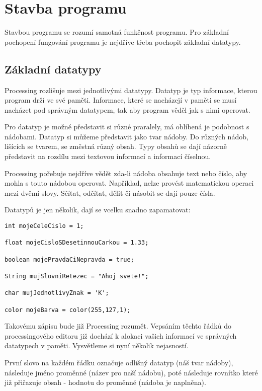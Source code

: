 \documentclass[11pt]{article}
\begin{document}
\newpage
\section{Stavba programu}


Stavbou programu se rozumí samotná funkčnost programu. Pro základní pochopení fungování programu je nejdříve třeba pochopit základní datatypy.

\subsection{Základní datatypy}

Processing rozlišuje mezi jednotlivými datatypy. Datatyp je typ informace, kterou program drží ve své paměti. Informace, které se nacházejí v paměti se musí nacházet pod správným datatypem, tak aby program věděl jak s nimi operovat.

Pro datatyp je možné představit si různé praralely, má oblíbená je podobnost s nádobami. Datatyp si můžeme představit jako tvar nádoby. Do různých nádob, lišících se tvarem, se změstná různý obsah. Typy obsahů se dají názorně představit na rozdílu mezi textovou informací a informací číselnou.

Processing pořebuje nejdříve vědět zda-li nádoba obsahuje text nebo číslo, aby mohla s touto nádobou operovat. Například, nelze provést matematickou operaci mezi dvěmi slovy. Sčítat, odčítat, dělit či násobit se dají pouze čísla.

Datatypů je jen několik, dají se vcelku snadno zapamatovat:

\begin{lstlisting}
int mojeCeleCislo = 1;

float mojeCisloSDesetinnouCarkou = 1.33;

boolean mojePravdaCiNepravda = true;

String mujSlovniRetezec = "Ahoj svete!";

char mujJednotlivyZnak = 'K';

color mojeBarva = color(255,127,1);
\end{lstlisting}

Takovému zápisu bude již Processing rozumět. Vepsáním těchto řádků do processingového editoru již dochází k alokaci vašich informací ve správných datatypech v paměti. Vysvětleme si nyní několik nejasností.

První slovo na každém řádku označuje odlišný datatyp (náš tvar nádoby), následuje jméno proměnné (název pro naší nádobu), poté následuje rovnítko které již přiřazuje obsah - hodnotu do proměnné (nádoba je naplněna).
\end{document}

